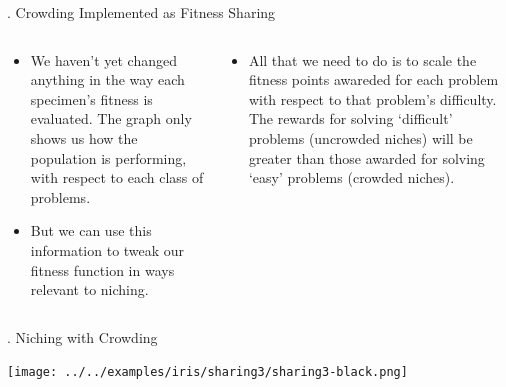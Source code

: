 \documentclass[9pt]{beamer}
\begin{document}
\begin{frame}{\theframenumber. Crowding Implemented as Fitness Sharing}
  \begin{columns}
    \begin{column}{.5\textwidth}
      \begin{itemize}
      \item We haven't yet changed anything in the way each specimen's fitness is evaluated. The graph only shows us how the population is performing, with respect to each class of problems.
      \item But we can use this information to tweak our fitness function in ways relevant to niching.
      \end{itemize}
    \end{column}
    \begin{column}{.5\textwidth}
      \begin{itemize}
      \item All that we need to do is to scale the fitness points awareded for each problem with respect to that problem's difficulty. The rewards for solving `difficult' problems (uncrowded niches) will be greater than those awarded for solving `easy' problems (crowded niches). 
      \end{itemize}
    \end{column}
    \end{columns}

\end{frame}

\begin{frame}{\theframenumber. Niching with Crowding}
  \begin{center}
  \texttt{[image: ../../examples/iris/sharing3/sharing3-black.png]}
  \end{center}
\end{frame}
\end{document}
